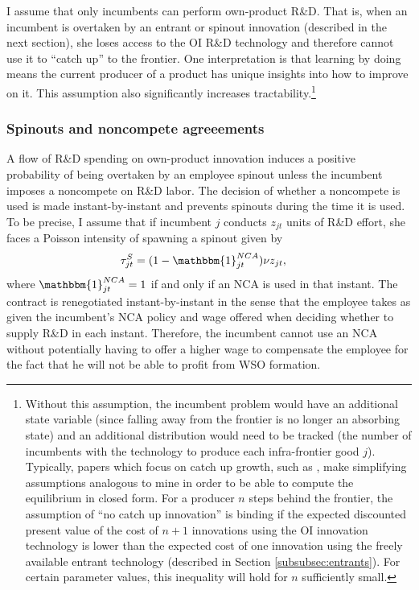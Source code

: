 \documentclass[ecta,nameyear,final]{econsocart}
\theoremstyle{plain}
\theoremstyle{remark}
\begin{document}
I assume that only incumbents can perform own-product R\&D. That is, when an incumbent is overtaken by an entrant or spinout innovation (described in the next section), she loses access to the OI R\&D technology and therefore cannot use it to ``catch up'' to the frontier. One interpretation is that learning by doing means the current producer of a product has unique insights into how to improve on it. This assumption also significantly increases tractability.\footnote{Without this assumption, the incumbent problem would have an additional state variable (since falling away from the frontier is no longer an absorbing state) and an additional distribution would need to be tracked (the number of incumbents with the technology to produce each infra-frontier good $j$). Typically, papers which focus on catch up growth, such as \cite{aghion_competition_2005}, make simplifying assumptions analogous to mine in order to be able to compute the equilibrium in closed form. For a producer $n$ steps behind the frontier, the assumption of ``no catch up innovation'' is binding if the expected discounted present value of the cost of $n + 1$ innovations using the OI innovation technology is lower than the expected cost of one innovation using the freely available entrant technology (described in Section \ref{subsubsec:entrants}). For certain parameter values, this inequality will hold for $n$ sufficiently small.} 

\subsubsection{Spinouts and noncompete agreeements}\label{subsubsec:generation_of_spinouts}

A flow of R\&D spending on own-product innovation induces a positive probability of being overtaken by an employee spinout unless the incumbent imposes a noncompete on R\&D labor. The decision of whether a noncompete is used is made instant-by-instant and prevents spinouts during the time it is used. To be precise, I assume that if incumbent $j$ conducts $z_{jt}$ units of R\&D effort, she faces a Poisson intensity of spawning a spinout given by 
\begin{align}
	\tau^S_{jt} &= (1-\mathbbm{1}^{NCA}_{jt}) \nu z_{jt}, \label{def:tau_S}
\end{align} 
where $\mathbbm{1}^{NCA}_{jt} = 1$ if and only if an NCA is used in that instant. The contract is renegotiated instant-by-instant in the sense that the employee takes as given the incumbent's NCA policy and wage offered when deciding whether to supply R\&D in each instant. Therefore, the incumbent cannot use an NCA without potentially having to offer a higher wage to compensate the employee for the fact that he will not be able to profit from WSO formation.
\end{document}
